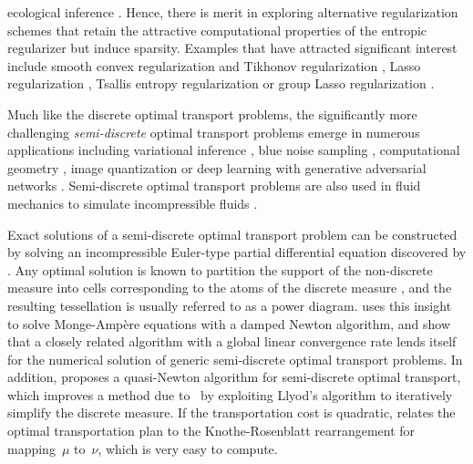 \documentclass[11pt, a4paper, oneside, reqno]{article}
\begin{document}
	ecological inference \citep{muzellec2017tsallis}. 
	Hence, there is merit in exploring alternative regularization schemes that retain the attractive computational properties of the entropic regularizer but induce sparsity. Examples that have attracted significant interest include smooth convex regularization and Tikhonov regularization \citep{dessein2018regularized, blondel2017smooth, seguy2017large, essid2018quadratically}, Lasso regularization \citep{li2016fast}, Tsallis entropy regularization \citep{muzellec2017tsallis} or group Lasso regularization \citep{courty2016optimal}. %
	
	Much like the discrete optimal transport problems, the significantly more challenging \emph{semi-discrete} optimal transport problems emerge in numerous applications including variational inference \citep{ambrogioni2018wasserstein}, blue noise sampling \citep{qin2017wasserstein}, computational geometry \citep{levy2015numerical}, image quantization \citep{de2012blue} or deep learning with generative adversarial networks \citep{arjovsky2017wasserstein, genevay2017learning, gulrajani2017improved}. Semi-discrete optimal transport problems are also used in fluid mechanics to simulate incompressible fluids \citep{de2015power}.
	
	Exact solutions of a semi-discrete optimal transport problem can be constructed by solving an incompressible Euler-type partial differential equation discovered by \citet{brenier1991polar}. Any optimal solution is known to partition the support of the non-discrete measure into cells corresponding to the atoms of the discrete measure \citep{aurenhammer1998minkowski}, and the resulting tessellation is usually referred to as a power diagram. 
	\citet{ref:mirebeau2015discretization} uses this insight to solve Monge-Amp{\`e}re equations with a damped Newton algorithm, and \citet{kitagawa2016convergence} show that a closely related algorithm with a global linear convergence rate lends itself for the numerical solution of generic semi-discrete optimal transport problems. In addition, \citet{merigot2011multiscale} proposes a quasi-Newton algorithm for semi-discrete optimal transport, which improves a method due to~\citet{aurenhammer1998minkowski} by exploiting Llyod's algorithm to iteratively simplify the discrete measure.
	If the transportation cost is quadratic, \citet{bonnotte2013knothe} relates the optimal transportation plan to the Knothe-Rosenblatt rearrangement for mapping~$\mu$ to~$\nu$, which is very easy to compute.
	
\end{document}

